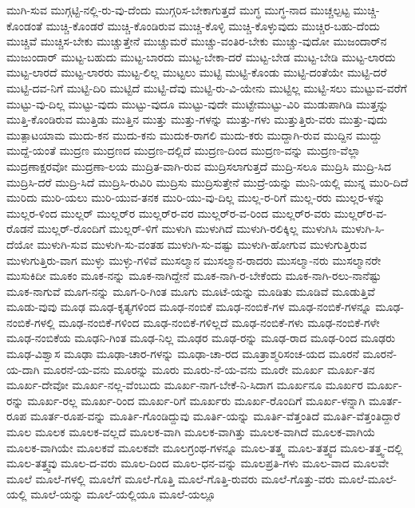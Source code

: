 {ಮುಗಿ-ಸುವ
ಮುಗ್ಗಟ್ಟಿ-ನಲ್ಲಿ-ರು-ವು-ದೆಂದು
ಮುಗ್ಗರಿಸ-ಬೇಕಾಗುತ್ತದೆ
ಮುಗ್ಧ
ಮುಗ್ಧ-ನಾದ
ಮುಚ್ಚಲ್ಪಟ್ಟ
ಮುಚ್ಚಿ-ಕೊಂಡಂತೆ
ಮುಚ್ಚಿ-ಕೊಂಡರೆ
ಮುಚ್ಚಿ-ಕೊಂಡಿರುವ
ಮುಚ್ಚಿ-ಕೊಳ್ಳಿ
ಮುಚ್ಚಿ-ಕೊಳ್ಳುವುದು
ಮುಚ್ಚಿರ-ಬಹು-ದೆಂದು
ಮುಚ್ಚಿವೆ
ಮುಚ್ಚಿಸ-ಬೇಕು
ಮುಚ್ಚುತ್ತೇನೆ
ಮುಚ್ಚುಮರೆ
ಮುಚ್ಚು-ವಂತಿರ-ಬೇಕು
ಮುಚ್ಚು-ವುದೋ
ಮುಜಂದಾರ್‌ನ
ಮುಜುಂದಾರ್
ಮುಟ್ಟ-ಬಹುದು
ಮುಟ್ಟ-ಬಾರದು
ಮುಟ್ಟ-ಬೇಕಾ-ದರೆ
ಮುಟ್ಟ-ಬೇಡ
ಮುಟ್ಟ-ಬೇಡಿ
ಮುಟ್ಟ-ಲಾರದು
ಮುಟ್ಟ-ಲಾರದೆ
ಮುಟ್ಟ-ಲಾರರು
ಮುಟ್ಟ-ಲಿಲ್ಲ
ಮುಟ್ಟಲು
ಮುಟ್ಟಿ
ಮುಟ್ಟಿ-ಕೊಂಡು
ಮುಟ್ಟಿ-ದಂತೆಯೇ
ಮುಟ್ಟಿ-ದರೆ
ಮುಟ್ಟಿ-ದವ-ನಿಗೆ
ಮುಟ್ಟಿ-ದಿರಿ
ಮುಟ್ಟಿದೆ
ಮುಟ್ಟಿ-ದೆವು
ಮುಟ್ಟಿ-ರು-ವಿ-ಯೇನು
ಮುಟ್ಟಿಲ್ಲ
ಮುಟ್ಟಿ-ಸಲು
ಮುಟ್ಟುವ-ವರೆಗೆ
ಮುಟ್ಟು-ವು-ದಿಲ್ಲ
ಮುಟ್ಟು-ವುದು
ಮುಟ್ಟು-ವುದೂ
ಮುಟ್ಟು-ವುದೇ
ಮುಟ್ಟೇಮುಟ್ಟು-ವಿರಿ
ಮುಡುಪಾಗಿಡಿ
ಮುತ್ತನ್ನು
ಮುತ್ತಿ-ಕೊಂಡಿರುವ
ಮುತ್ತಿಡು
ಮುತ್ತಿನ
ಮುತ್ತು
ಮುತ್ತು-ಗಳನ್ನು
ಮುತ್ತು-ಗಳು
ಮುತ್ತುತ್ತಿರು-ವರು
ಮುತ್ತು-ವುದು
ಮುತ್ಪಾಟಯಾಮ
ಮುದು-ಕನ
ಮುದು-ಕನು
ಮುದುಕ-ರಾಗಲಿ
ಮುದು-ಕರು
ಮುದ್ದಾಗಿ-ರುವ
ಮುದ್ದಿನ
ಮುದ್ದು
ಮುದ್ದೆ-ಯಂತೆ
ಮುದ್ರಣ
ಮುದ್ರಣದ
ಮುದ್ರಣ-ದಲ್ಲಿದೆ
ಮುದ್ರಣ-ದಿಂದ
ಮುದ್ರಣ-ವನ್ನು
ಮುದ್ರಣ-ವೆಲ್ಲಾ
ಮುದ್ರಣಾಕ್ಷರವೋ
ಮುದ್ರಣಾ-ಲಯ
ಮುದ್ರಿತ-ವಾಗಿ-ರುವ
ಮುದ್ರಿಸಲಾಗುತ್ತದೆ
ಮುದ್ರಿ-ಸಲೂ
ಮುದ್ರಿಸಿ
ಮುದ್ರಿ-ಸಿದ
ಮುದ್ರಿಸಿ-ದರೆ
ಮುದ್ರಿ-ಸಿದೆ
ಮುದ್ರಿಸಿ-ರುವಿರಿ
ಮುದ್ರಿಸು
ಮುದ್ರಿಸುತ್ತೇನೆ
ಮುದ್ರೆ-ಯನ್ನು
ಮುನಿ-ಯಲ್ಲಿ
ಮುನ್ನ
ಮುರಿ-ದಿದೆ
ಮುರಿದು
ಮುರಿ-ಯಲು
ಮುರಿ-ಯುವ-ತನಕ
ಮುರಿ-ಯು-ವು-ದಿಲ್ಲ
ಮುಲ್ಲ-ರ-ರಿಗೆ
ಮುಲ್ಲ-ರರು
ಮುಲ್ಲರ-ಳನ್ನು
ಮುಲ್ಲರ-ಳಿಂದ
ಮುಲ್ಲರ್
ಮುಲ್ಲರ್‌ರ
ಮುಲ್ಲರ್‌ರ-ವರ
ಮುಲ್ಲರ್‌ರ-ವ-ರಿಂದ
ಮುಲ್ಲರ್‌ರ-ವರು
ಮುಲ್ಲರ್‌ರ-ವ-ರೊಡನೆ
ಮುಲ್ಲರ್‌-ರೊಂದಿಗೆ
ಮುಲ್ಲರ್‌-ಳಿಗೆ
ಮುಳುಗಿ
ಮುಳುಗಿದೆ
ಮುಳುಗಿ-ರಲಿಕ್ಕಿಲ್ಲ
ಮುಳುಗಿಸಿ
ಮುಳುಗಿ-ಸಿ-ದೆಯೋ
ಮುಳುಗಿ-ಸುವ
ಮುಳುಗಿ-ಸು-ವಂತಹ
ಮುಳುಗಿ-ಸು-ವಷ್ಟು
ಮುಳುಗಿ-ಹೋಗುವ
ಮುಳುಗುತ್ತಿರುವ
ಮುಳುಗುತ್ತಿರು-ವಾಗ
ಮುಳ್ಳು
ಮುಳ್ಳು-ಗಳಿವೆ
ಮುಸಲ್ಮಾನ
ಮುಸಲ್ಮಾನ-ರಾದರು
ಮುಸಲ್ಮಾ-ನರು
ಮುಸಲ್ಮಾನರೇ
ಮುಸುಕಿದೀ
ಮೂಕಂ
ಮೂಕ-ನನ್ನು
ಮೂಕ-ನಾಗಿದ್ದೇನೆ
ಮೂಕ-ನಾಗಿ-ರ-ಬೇಕೆಂದು
ಮೂಕ-ನಾಗಿ-ರಲು-ನಾನೆಷ್ಟು
ಮೂಕ-ನಾಗುವೆ
ಮೂಗ-ನನ್ನು
ಮೂಗ-ರಿ-ಗಿಂತ
ಮೂಗು
ಮೂಟೆ-ಯನ್ನು
ಮೂಡಿತು
ಮೂಡಿವೆ
ಮೂಡುತ್ತಿವೆ
ಮೂಡು-ವುವು
ಮೂಢ
ಮೂಢ-ಕೃತ್ಯಗಳಿಂದ
ಮೂಢ-ನಂಬಿಕೆ
ಮೂಢ-ನಂಬಿಕೆ-ಗಳ
ಮೂಢ-ನಂಬಿಕೆ-ಗಳನ್ನೂ
ಮೂಢ-ನಂಬಿಕೆ-ಗಳಲ್ಲಿ
ಮೂಢ-ನಂಬಿಕೆ-ಗಳಿಂದ
ಮೂಢ-ನಂಬಿಕೆ-ಗಳಿಲ್ಲದೆ
ಮೂಢ-ನಂಬಿಕೆ-ಗಳು
ಮೂಢ-ನಂಬಿಕೆ-ಗಳೇ
ಮೂಢ-ನಂಬಿಕೆಯ
ಮೂಢನಿ-ಗಿಂತ
ಮೂಢ-ನಿಲ್ಲ
ಮೂಢರ
ಮೂಢ-ರನ್ನು
ಮೂಢ-ರಾದ
ಮೂಢ-ರಿಂದ
ಮೂಢರು
ಮೂಢ-ವಿಶ್ವಾಸ
ಮೂಢಾ
ಮೂಢಾ-ಚಾರ-ಗಳನ್ನು
ಮೂಢಾ-ಚಾ-ರದ
ಮೂತ್ರಾಶ್ಮರಿಸಂಚ-ಯದ
ಮೂರನೆ
ಮೂರನೆ-ಯ-ದಾಗಿ
ಮೂರನೆ-ಯ-ವನು
ಮೂರನ್ನು
ಮೂರು
ಮೂರು-ನೆ-ಯ-ವನು
ಮೂರೇ
ಮೂರ್ಖ
ಮೂರ್ಖ-ತನ
ಮೂರ್ಖ-ದೇವೋ
ಮೂರ್ಖ-ನಲ್ಲ-ವೆಂಬುದು
ಮೂರ್ಖ-ನಾಗ-ಬೇಕೆ-ನಿ-ಸಿದಾಗ
ಮೂರ್ಖನೂ
ಮೂರ್ಖರ
ಮೂರ್ಖ-ರನ್ನು
ಮೂರ್ಖ-ರಲ್ಲ
ಮೂರ್ಖ-ರಿಂದ
ಮೂರ್ಖ-ರಿಗೆ
ಮೂರ್ಖರು
ಮೂರ್ಖ-ರೊಂದಿಗೆ
ಮೂರ್ಖ-ಳನ್ನಾಗಿ
ಮೂರ್ತ-ರೂಪ
ಮೂರ್ತ-ರೂಪ-ವನ್ನು
ಮೂರ್ತಿ-ಗೊಂಡಿದ್ದುವು
ಮೂರ್ತಿ-ಯನ್ನು
ಮೂರ್ತಿ-ವೆತ್ತಂತಿದೆ
ಮೂರ್ತಿ-ವೆತ್ತಂತಿದ್ದಾರೆ
ಮೂಲ
ಮೂಲಕ
ಮೂಲಕ-ವಲ್ಲದೆ
ಮೂಲಕ-ವಾಗಿ
ಮೂಲಕ-ವಾಗಿತ್ತು
ಮೂಲಕ-ವಾಗಿದೆ
ಮೂಲಕ-ವಾಗಿಯೆ
ಮೂಲಕ-ವಾಗಿಯೇ
ಮೂಲಕವೆ
ಮೂಲಕವೇ
ಮೂಲಗ್ರಂಥ-ಗಳನ್ನೂ
ಮೂಲ-ತತ್ತ್ವ
ಮೂಲ-ತತ್ತ್ವದ
ಮೂಲ-ತತ್ತ್ವ-ದಲ್ಲಿ
ಮೂಲ-ತತ್ತ್ವವು
ಮೂಲ-ದ-ವರು
ಮೂಲ-ದಿಂದ
ಮೂಲ-ಧನ-ವನ್ನು
ಮೂಲಪ್ರತಿ-ಗಳು
ಮೂಲ-ವಾದ
ಮೂಲವೇ
ಮೂಲೆ
ಮೂಲೆ-ಗಳಲ್ಲಿ
ಮೂಲೆಗೆ
ಮೂಲೆ-ಗೊತ್ತಿ
ಮೂಲೆ-ಗೊತ್ತಿ-ರುವರು
ಮೂಲೆ-ಗೊತ್ತು-ವರು
ಮೂಲೆ-ಮೂಲೆ-ಯಲ್ಲಿ
ಮೂಲೆ-ಯನ್ನು
ಮೂಲೆ-ಯಲ್ಲಿಯೂ
ಮೂಲೆ-ಯಲ್ಲೂ
}
